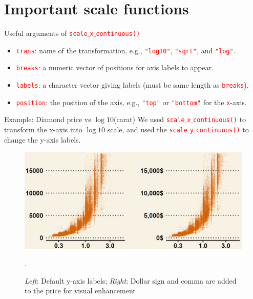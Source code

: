 \documentclass{beamer}
\begin{document}
\section{Important scale functions}
\begin{frame}{Useful arguments of \texttt{\textcolor{red}{scale$\_$x$\_$continuous()}}}
\begin{itemize}
\item \texttt{\textcolor{red}{trans}}: name of the transformation, e.g., \texttt{\textcolor{red}{"log10"}}, \texttt{\textcolor{red}{"sqrt"}}, and \texttt{\textcolor{red}{"log"}}.
\vspace{0.3in}

\item \texttt{\textcolor{red}{breaks}}: a numeric vector of positions for axis labels to appear.
\vspace{0.3in}

\item \texttt{\textcolor{red}{labels}}: a character vector giving labels (must be same length as \texttt{\textcolor{red}{breaks}}).

\vspace{0.3in}
\item \texttt{\textcolor{red}{position}}: the position of the axis, e.g., \texttt{\textcolor{red}{"top"}} or \texttt{\textcolor{red}{"bottom"}} for the \texttt{\textcolor{red}{x}}-axis.
\end{itemize}
\end{frame}

\begin{frame}{Example: Diamond price vs $\log10$(carat)}
We used \texttt{\textcolor{red}{scale$\_$x$\_$continuous()}} to transform the x-axis into $\log10$ scale, and used the \texttt{\textcolor{red}{scale$\_$y$\_$continuous()}} to change the y-axis labels.
\begin{figure}
\includegraphics[width=0.99\linewidth]{PlotsLec3/DiamondExample}
\caption{\small{\textit{Left}: Default y-axis labels; \textit{Right}: Dollar sign and comma are added to the price for visual enhancement}}.
\end{figure}
\end{frame}
\end{document}

